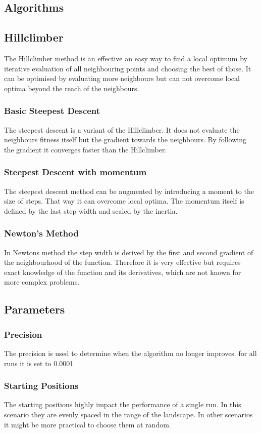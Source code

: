 \documentclass{scrartcl}
\begin{document}
\subsection{Algorithms}
\subsection{Hillclimber}
The Hillclimber method is an effective an easy way to find a local optimum by iterative evaluation of all neighbouring points and choosing the best of those. It can be optimised by evaluating more neighbours but can not overcome local optima beyond the reach of the neighbours.
\subsubsection{Basic Steepest Descent}
The steepest descent is a variant of the Hillclimber. It does not evaluate the neighbours fitness itself but the gradient towards the neighbours. By following the gradient it converges faster than the Hillclimber.
\subsubsection{Steepest Descent with momentum}
The steepest descent method can be augmented by introducing a moment to the size of steps. That way it can overcome local optima. The momentum itself is defined by the last step width and scaled by the inertia.
\subsubsection{Newton’s Method}
In Newtons method the step width is derived by the first and second gradient of the neighbourhood of the function. Therefore it is very effective but requires exact knowledge of the function and its derivatives, which are not known for more complex problems.

\subsection{Parameters}
\subsubsection{Precision}
The precision is used to determine when the algorithm no longer improves. for all runs it is set to 0.0001
\subsubsection{Starting Positions}
The starting positions highly impact the performance of a single run. In this scenario they are evenly spaced in the range of the landscape. In other scenarios it might be more practical to choose them at random.
\end{document}
